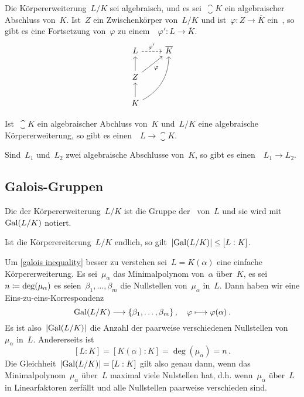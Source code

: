 \begin{theorem}
  Die Körpererweiterung~$L/K$ sei algebraisch, und es sei~$\closure{K}$ ein algebraischer Abschluss von~$K$.
  Ist~$Z$ ein Zwischenkörper von~$L/K$ und ist~$\varphi \colon Z \to \overline{K}$ ein~, so gibt es eine Fortsetzung von~$\varphi$ zu einem~~$\varphi' \colon L \to \overline{K}$.
  \[
    \begin{tikzcd}
      L
      \arrow[dashed]{r}[above]{\varphi'}
      &
      \closure{K}
      \\
      Z
      \arrow{u}
      \arrow{ur}[below right]{\varphi}
      &
      {}
      \\
      K
      \arrow{u}
      \arrow[bend right]{uur}
      &
      {}
    \end{tikzcd}
  \]
\end{theorem}

\begin{corollary}
  Ist~$\closure{K}$ ein algebraischer Abchluss von~$K$ und~$L/K$ eine algebraische Körpererweiterung, so gibt es einen~~$L \to \closure{K}$.
\end{corollary}

\begin{corollary}
  Sind~$L_1$ und~$L_2$ zwei algebraische Abschlusse von~$K$, so gibt es einen~~$L_1 \to L_2$.
\end{corollary}



\subsection{Galois-Gruppen}

\begin{definition}
  Die  der Körpererweiterung~$L/K$ ist die Gruppe der~ von~$L$ und sie wird mit~$\operatorname{Gal}(L/K)$ notiert.
\end{definition}

\begin{proposition}
  \label{galois inequality}
  Ist die Körperereiterung~$L/K$ endlich, so gilt~$\lvert \operatorname{Gal}(L/K) \rvert \leq [L : K]$.
\end{proposition}

Um \cref{galois inequality} besser zu verstehen sei~$L = K(\alpha)$ eine einfache Körpererweiterung.
Es sei~$\mu_\alpha$ das Minimalpolynom von~$\alpha$ über~$K$, es sei~$n \coloneqq \deg(\mu_\alpha)$ es seien~$\beta_1, \dotsc, \beta_m$ die Nullstellen von~$\mu_\alpha$ in~$L$.
Dann haben wir eine Eins-zu-eins-Korrespondenz
\[
  \Gal(L/K)
  \to
  \{ \beta_1, \dotsc, \beta_m \} \,,
  \quad
  \varphi
  \mapsto
  \varphi(\alpha) \,.
\]
Es ist also~$\lvert\operatorname{Gal}(L/K)\rvert$ die Anzahl der paarweise verschiedenen Nullstellen von~$\mu_\alpha$ in~$L$.
Andererseits ist
\[
  [L : K] = [K(\alpha) : K] = \deg(\mu_\alpha) = n \,.
\]
Die Gleichheit~$\lvert\operatorname{Gal}(L/K)\rvert = [L : K]$ gilt also genau dann, wenn das Minimalpolynom~$\mu_\alpha$ über~$L$ maximal viele Nulstellen hat, d.h. wenn~$\mu_\alpha$ über~$L$ in Linearfaktoren zerfällt und alle Nullstellen paarweise verschieden sind.

